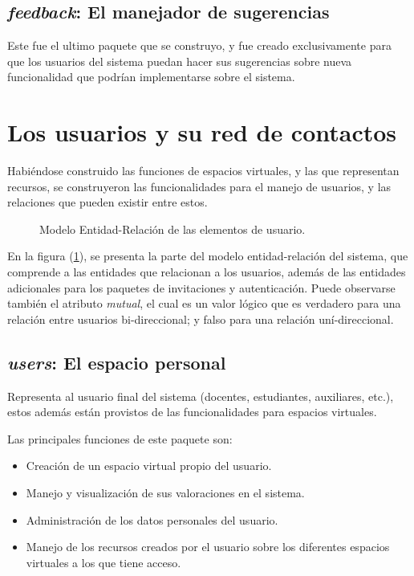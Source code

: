\subsection{\emph{feedback}: El manejador de sugerencias}
Este fue el ultimo paquete que se construyo, y fue creado exclusivamente para
que los usuarios del sistema puedan hacer sus sugerencias sobre nueva
funcionalidad que podrían implementarse sobre el sistema.

\section{Los usuarios y su red de contactos}
Habiéndose construido las funciones de espacios virtuales, y las que representan
recursos, se construyeron las funcionalidades para el manejo de usuarios, y las
relaciones que pueden existir entre estos.

\begin{figure}
\centering

\caption{Modelo Entidad-Relación de las elementos de usuario.}
\label{modelo5}
\end{figure}

En la figura (\ref{modelo5}), se presenta la parte del modelo entidad-relación
del sistema, que comprende a las entidades que relacionan a los usuarios, además
de las entidades adicionales para los paquetes de invitaciones y
autenticación. Puede observarse también el atributo \emph{mutual}, el cual es
un valor lógico que es verdadero para una relación entre usuarios
bi-direccional; y falso para una relación uní-direccional.

\subsection{\emph{users}: El espacio personal}
Representa al usuario final del sistema (docentes, estudiantes, auxiliares,
etc.), estos además están provistos de las funcionalidades para espacios
virtuales.

Las principales funciones de este paquete son:

\begin{itemize}
\item Creación de un espacio virtual propio del usuario.
\item Manejo y visualización de sus valoraciones en el sistema.
\item Administración de los datos personales del usuario.
\item Manejo de los recursos creados por el usuario sobre los diferentes
espacios virtuales a los que tiene acceso.
\end{itemize}

